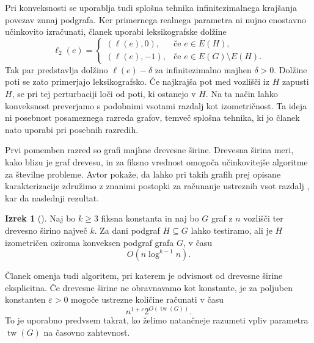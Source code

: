 \documentclass[sigconf
]{acmart}
\theoremstyle{definition}
\newtheorem{theorem}{Izrek}[section]
\begin{document}
Pri konveksnosti se uporablja tudi splošna tehnika infinitezimalnega krajšanja povezav zunaj podgrafa. Ker primernega realnega parametra ni nujno enostavno učinkovito izračunati, članek uporabi leksikografske dolžine
\begin{equation}
    \ell_2(e)=
    \begin{cases}
        (\ell(e),0), & \text{če } e\in E(H),\\
        (\ell(e),-1), & \text{če } e\in E(G)\setminus E(H).
    \end{cases}
\end{equation}
Tak par predstavlja dolžino $\ell(e)-\delta$ za infinitezimalno majhen $\delta>0$. Dolžine poti se zato primerjajo leksikografsko. Če najkrajša pot med vozlišči iz $H$ zapusti $H$, se pri tej perturbaciji loči od poti, ki ostanejo v $H$. Na ta način lahko konveksnost preverjamo s podobnimi vsotami razdalj kot izometričnost. Ta ideja ni posebnost posameznega razreda grafov, temveč splošna tehnika, ki jo članek nato uporabi pri posebnih razredih.

Prvi pomemben razred so grafi majhne drevesne širine. Drevesna širina meri, kako blizu je graf drevesu, in za fiksno vrednost omogoča učinkovitejše algoritme za številne probleme. Avtor pokaže, da lahko pri takih grafih prej opisane karakterizacije združimo z znanimi postopki za računanje ustreznih vsot razdalj \cite{CABELLO2009815, bringmann_et_al}, kar da naslednji rezultat.

\begin{theorem}[\cite{main_paper}]
Naj bo $k\geq 3$ fiksna konstanta in naj bo $G$ graf z $n$ vozlišči ter drevesno širino največ $k$. Za dani podgraf $H \subseteq G$ lahko testiramo, ali je $H$ izometričen oziroma konveksen podgraf grafa $G$, v času
\begin{equation}
    O(n \log^{k-1} n).
\end{equation}
\end{theorem}

Članek omenja tudi algoritem, pri katerem je odvisnost od drevesne širine eksplicitna. Če drevesne širine ne obravnavamo kot konstante, je za poljuben konstanten $\varepsilon > 0$ mogoče ustrezne količine računati v času \cite{bringmann_et_al}
\begin{equation}
    n^{1+\varepsilon}2^{O(\operatorname{tw}(G))}.
\end{equation}
To je uporabno predvsem takrat, ko želimo natančneje razumeti vpliv parametra $\operatorname{tw}(G)$ na časovno zahtevnost.
\end{document}
